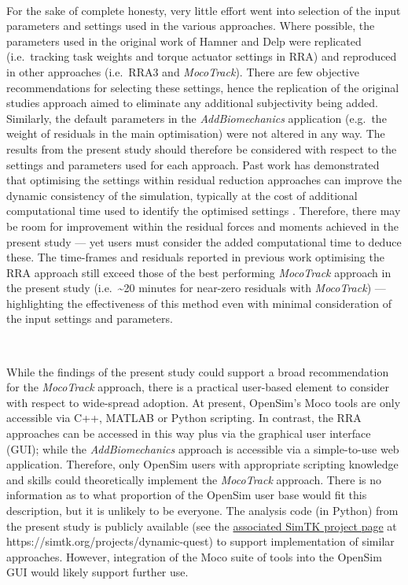 \documentclass[]{elsarticle} %
\begin{document}
~

For the sake of complete honesty, very little effort went into selection
of the input parameters and settings used in the various approaches.
Where possible, the parameters used in the original work of Hamner and
Delp \citep{Hamner2013} were replicated (i.e.~tracking task weights and
torque actuator settings in RRA) and reproduced in other approaches
(i.e.~RRA3 and \emph{MocoTrack}). There are few objective
recommendations for selecting these settings, hence the replication of
the original studies \citep{Hamner2013} approach aimed to eliminate any
additional subjectivity being added. Similarly, the default parameters
in the \emph{AddBiomechanics} application (e.g.~the weight of residuals
in the main optimisation) were not altered in any way. The results from
the present study should therefore be considered with respect to the
settings and parameters used for each approach. Past work has
demonstrated that optimising the settings within residual reduction
approaches can improve the dynamic consistency of the simulation,
typically at the cost of additional computational time used to identify
the optimised settings \citep{Samaan2016, Sturdy2022}. Therefore, there
may be room for improvement within the residual forces and moments
achieved in the present study --- yet users must consider the added
computational time to deduce these. The time-frames and residuals
reported in previous work optimising the RRA approach
\citep{Samaan2016, Sturdy2022} still exceed those of the best performing
\emph{MocoTrack} approach in the present study (i.e.~\textasciitilde20
minutes for near-zero residuals with \emph{MocoTrack}) --- highlighting
the effectiveness of this method even with minimal consideration of the
input settings and parameters.

~

While the findings of the present study could support a broad
recommendation for the \emph{MocoTrack} approach, there is a practical
user-based element to consider with respect to wide-spread adoption. At
present, OpenSim's Moco tools are only accessible via C++, MATLAB or
Python scripting. In contrast, the RRA approaches can be accessed in
this way plus via the graphical user interface (GUI); while the
\emph{AddBiomechanics} approach is accessible via a simple-to-use web
application. Therefore, only OpenSim users with appropriate scripting
knowledge and skills could theoretically implement the \emph{MocoTrack}
approach. There is no information as to what proportion of the OpenSim
user base would fit this description, but it is unlikely to be everyone.
The analysis code (in Python) from the present study is publicly
available (see the
\href{https://simtk.org/projects/dynamic-quest}{associated SimTK project
page} at https://simtk.org/projects/dynamic-quest) to support
implementation of similar approaches. However, integration of the Moco
suite of tools into the OpenSim GUI would likely support further use.
\end{document}
